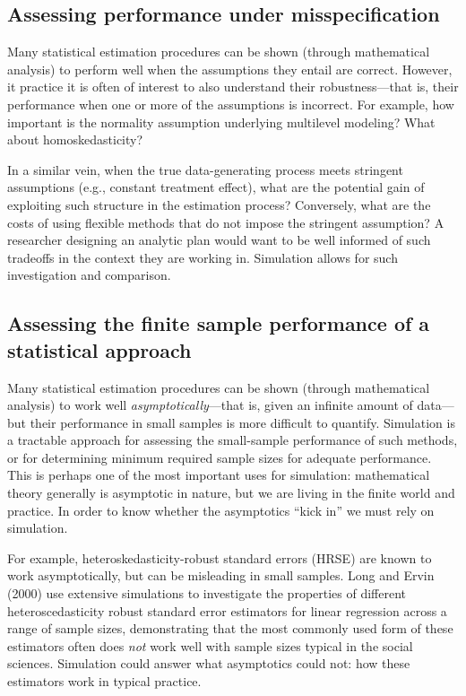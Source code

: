 \documentclass[
]{book}
\begin{document}
\hypertarget{assessing-performance-under-misspecification}{%
\subsection{Assessing performance under misspecification}\label{assessing-performance-under-misspecification}}

Many statistical estimation procedures can be shown (through mathematical analysis) to perform well when the assumptions they entail are correct.
However, it practice it is often of interest to also understand their robustness---that is, their performance when one or more of the assumptions is incorrect.
For example, how important is the normality assumption underlying multilevel modeling?
What about homoskedasticity?

In a similar vein, when the true data-generating process meets stringent assumptions (e.g., constant treatment effect), what are the potential gain of exploiting such structure in the estimation process?
Conversely, what are the costs of using flexible methods that do not impose the stringent assumption?
A researcher designing an analytic plan would want to be well informed of such tradeoffs in the context they are working in.
Simulation allows for such investigation and comparison.

\hypertarget{assessing-the-finite-sample-performance-of-a-statistical-approach}{%
\subsection{Assessing the finite sample performance of a statistical approach}\label{assessing-the-finite-sample-performance-of-a-statistical-approach}}

Many statistical estimation procedures can be shown (through mathematical analysis) to work well \emph{asymptotically}---that is, given an infinite amount of data---but their performance in small samples is more difficult to quantify.
Simulation is a tractable approach for assessing the small-sample performance of such methods, or for determining minimum required sample sizes for adequate performance.
This is perhaps one of the most important uses for simulation: mathematical theory generally is asymptotic in nature, but we are living in the finite world and practice.
In order to know whether the asymptotics ``kick in'' we must rely on simulation.

For example, heteroskedasticity-robust standard errors (HRSE) are known to work asymptotically, but can be misleading in small samples.
Long and Ervin (2000) use extensive simulations to investigate the properties of different heteroscedasticity robust standard error estimators for linear regression across a range of sample sizes, demonstrating that the most commonly used form of these estimators often does \emph{not} work well with sample sizes typical in the social sciences.
Simulation could answer what asymptotics could not: how these estimators work in typical practice.
\end{document}
